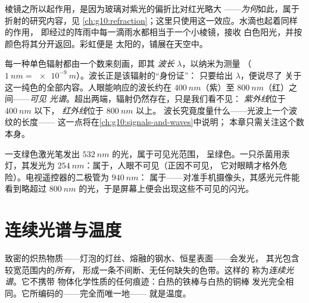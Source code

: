 \begin{remark}[棱镜与雨滴]\label{rem:g10:light-spectra:rainbow}
棱镜之所以起作用，是因为玻璃对紫光的偏折比对红光略大
——\emph{为何}如此，属于折射的研究内容，见
\cref{ch:g10:refraction}；这里只使用这一效应。水滴也起着同样的作用，
即经过的阵雨中每一滴雨水都相当于一个小棱镜，接收
白色阳光，并按颜色将其分开返回。彩虹便是
太阳的，铺展在天空中。
\end{remark}

\begin{definition}\label{def:g10:light-spectra:wavelength}
每一种单色辐射都由一个数来刻画，即其
\emph{波长} $\lambda$，以纳米为测量
（$\qty{1}{nm} = \qty{e-9}{m}$）。波长正是该辐射的“身份证”：
只要给出 $\lambda$，便说尽了
关于这一纯色的全部内容。人眼能响应的波长约在
$\qty{400}{nm}$（紫）至 $\qty{800}{nm}$（红）之间——\emph{可见
光谱}。超出两端，辐射仍然存在，只是我们看不见：
\emph{紫外线}位于 $\qty{400}{nm}$ 以下，
\emph{红外线}位于 $\qty{800}{nm}$ 以上。
波长究竟度量什么——光波上一个波纹的长度——
这一点将在\cref{ch:g10:signals-and-waves}中说明；
本章只需关注这个数本身。
\end{definition}

\begin{example}[读取波长]\label{ex:g10:light-spectra:classify}
一支绿色激光笔发出 $\qty{532}{nm}$ 的光，属于可见光范围，
呈绿色。一只杀菌用汞灯，其发光为
$\qty{254}{nm}$：属于，人眼不可见（正因不可见，
它对眼睛才格外危险）。电视遥控器的二极管为 $\qty{940}{nm}$：
属于——对准手机摄像头，其感光元件能看到略超过
$\qty{800}{nm}$ 的光，于是屏幕上便会出现这些不可见的闪光。
\end{example}

\section{连续光谱与温度}

\begin{definition}[连续光谱]\label{def:g10:light-spectra:continuous}
致密的炽热物质——灯泡的灯丝、熔融的钢水、恒星表面——会发光，
其光包含较宽范围内的\emph{所有}，
形成一条不间断、无任何缺失的色带。这样的
称为\emph{连续光谱}。它不携带
物体化学性质的任何痕迹：白热的铁棒与白热的铜棒
发光完全相同。它所编码的——完全而唯一地——
就是温度。
\end{definition}

